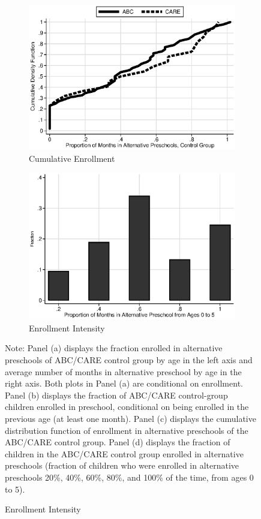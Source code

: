 \begin{figure}
\begin{subfigure}[h]{0.4\textwidth}
		\centering
		\caption{Cumulative Enrollment} \label{fig:treatsubcare}
		\includegraphics[width=\textwidth]{output/abccare_controlcontamination.eps}
\end{subfigure}
\begin{subfigure}[h]{0.4\textwidth}
	\centering
	\caption{Enrollment Intensity} \label{fig:proportion-alt-pre}
		\includegraphics[width=\textwidth]{output/abccare_Vfractimes.eps}
\end{subfigure}%

\footnotesize \justify
Note: Panel (a) displays the fraction enrolled in alternative preschools of ABC/CARE control group by age in the left axis and average number of months in alternative preschool by age in the right axis. Both plots in Panel (a) are conditional on enrollment. Panel (b) displays the fraction of ABC/CARE control-group children enrolled in preschool, conditional on being enrolled in the previous age (at least one month). Panel (c) displays the cumulative distribution function of enrollment in alternative preschools of the ABC/CARE control group. Panel (d) displays the fraction of children in the ABC/CARE control group enrolled in alternative preschools (fraction of children who were enrolled in alternative preschools 20\%, 40\%, 60\%, 80\%, and 100\% of the time, from ages 0 to 5). \\
\end{figure}

